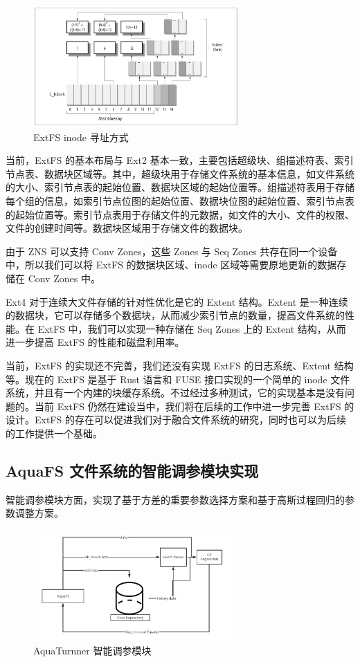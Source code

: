 \begin{figure}[htbp]
  \centering
  \includegraphics[width=0.7\textwidth]{fig/extfs-inode}
  \caption{ExtFS inode 寻址方式}
  \label{extfs-inode}
\end{figure}

当前，ExtFS 的基本布局与 Ext2 基本一致，主要包括超级块、组描述符表、索引节点表、数据块区域等。其中，超级块用于存储文件系统的基本信息，如文件系统的大小、索引节点表的起始位置、数据块区域的起始位置等。组描述符表用于存储每个组的信息，如索引节点位图的起始位置、数据块位图的起始位置、索引节点表的起始位置等。索引节点表用于存储文件的元数据，如文件的大小、文件的权限、文件的创建时间等。数据块区域用于存储文件的数据块。

由于 ZNS 可以支持 Conv Zones，这些 Zones 与 Seq Zones 共存在同一个设备中，所以我们可以将 ExtFS 的数据块区域、inode 区域等需要原地更新的数据存储在 Conv Zones 中。

Ext4 对于连续大文件存储的针对性优化是它的 Extent 结构。Extent 是一种连续的数据块，它可以存储多个数据块，从而减少索引节点的数量，提高文件系统的性能。在 ExtFS 中，我们可以实现一种存储在 Seq Zones 上的 Extent 结构，从而进一步提高 ExtFS 的性能和磁盘利用率。

当前，ExtFS 的实现还不完善，我们还没有实现 ExtFS 的日志系统、Extent 结构等。现在的 ExtFS 是基于 Rust 语言和 FUSE 接口实现的一个简单的 inode 文件系统，并且有一个内建的块缓存系统。不过经过多种测试，它的实现基本是没有问题的。当前 ExtFS 仍然在建设当中，我们将在后续的工作中进一步完善 ExtFS 的设计。ExtFS 的存在可以促进我们对于融合文件系统的研究，同时也可以为后续的工作提供一个基础。

\subsection{AquaFS 文件系统的智能调参模块实现}

智能调参模块方面，实现了基于方差的重要参数选择方案和基于高斯过程回归的参数调整方案。

\begin{figure}[htbp]
  \centering
  \includegraphics[width=0.7\textwidth]{fig/aquaturnner}
  \caption{AquaTurnner 智能调参模块}
  \label{aquaturnner}
\end{figure}

